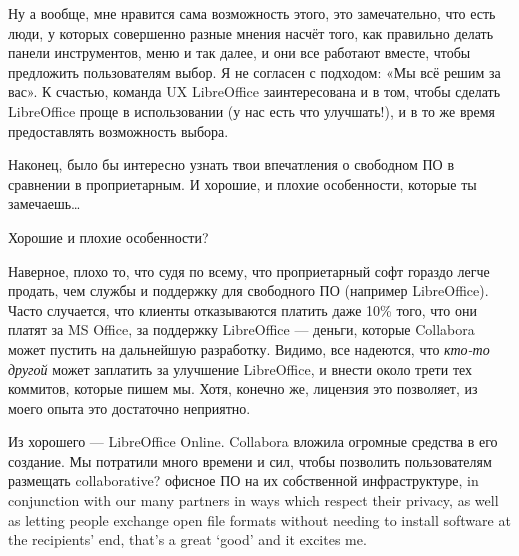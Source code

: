 \documentclass[10pt, a5paper]{article}
\begin{document}
\begin{Parallel}[p]{}{}
{Ну а вообще, мне нравится сама возможность этого, это замечательно, что есть люди, у которых совершенно разные мнения насчёт того, как правильно делать панели инструментов, меню и так далее, и они все работают вместе, чтобы предложить пользователям выбор. Я не согласен с подходом: «Мы всё решим за вас». К счастью, команда UX LibreOffice заинтересована и в том, чтобы сделать LibreOffice проще в использовании (у нас есть что улучшать!), и в то же время предоставлять возможность выбора.

\newpage
\q Наконец, было бы интересно узнать твои впечатления о свободном ПО в сравнении в проприетарным. И хорошие, и плохие особенности, которые ты замечаешь… 

\a Хорошие и плохие особенности?

Наверное, плохо то, что судя по всему, что проприетарный софт гораздо легче продать, чем службы и поддержку для свободного ПО (например LibreOffice). Часто случается, что клиенты отказываются платить даже 10\% того, что они платят за MS Office, за поддержку LibreOffice — деньги, которые Collabora может пустить на дальнейшую разработку. Видимо, все надеются, что \emph{кто-то другой} может заплатить за улучшение LibreOffice, и внести около трети тех коммитов, которые пишем мы. Хотя, конечно же, лицензия это позволяет, из моего опыта это достаточно неприятно.

Из хорошего — LibreOffice Online. Collabora вложила огромные средства в его создание. Мы потратили много времени и сил, чтобы позволить пользователям размещать {\color{red} collaborative? офисное ПО на их собственной инфраструктуре, in conjunction with our many partners in ways which respect their privacy, as well as letting people exchange open file formats without needing to install software at the recipients' end, that's a great ‘good’ and it excites me.}

\vfill
     }
   \end{Parallel}









 
\end{document}

